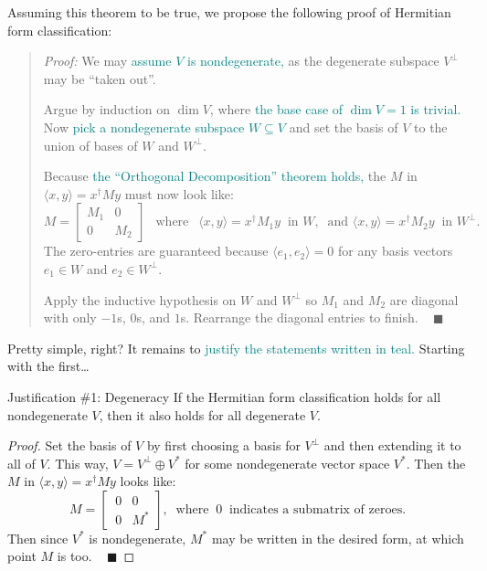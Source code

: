 Assuming this theorem to be true, we propose the following proof of Hermitian form classification: \vspace{0.1cm}
\begin{quote}
    \textit{Proof:} We may \textcolor{teal}{assume $V$ is nondegenerate,} as the degenerate subspace $V^{\perp}$ may be ``taken out''. \vspace{0.2cm}
    
    Argue by induction on $\dim V$, where \textcolor{teal}{the base case of $\dim V = 1$ is trivial.}  Now \textcolor{teal}{pick a nondegenerate subspace $W \subseteq V$} and set the basis of $V$ to the union of bases of $W$ and $W^{\perp}$. \vspace{0.2cm}
    
    Because \textcolor{teal}{the ``Orthogonal Decomposition'' theorem holds,} the $M$ in $\langle x, y \rangle = x^{\dagger}My$ must now look like:
    \[ M = \begin{bmatrix} M_1 & 0 \\ 0 & M_2 \end{bmatrix} ~~ \text{ where } ~ ~\langle x, y \rangle = x^{\dagger}M_1y ~ \text{ in } W, ~ \text{ and } \langle x, y \rangle = x^{\dagger}M_2y ~ \text{ in } W^{\perp}. \]
    The zero-entries are guaranteed because $\langle e_1, e_2 \rangle = 0$ for any basis vectors $e_1 \in W$ and $e_2 \in W^{\perp}$. \vspace{0.2cm}
    
    Apply the inductive hypothesis on $W$ and $W^{\perp}$ so $M_1$ and $M_2$ are diagonal with only $-1$s, $0$s, and $1$s.  Rearrange the diagonal entries to finish. ~ $\blacksquare$
\end{quote}

Pretty simple, right?  It remains to \textcolor{teal}{justify the statements written in teal.}  Starting with the first\dots

\begin{theorem}{Justification \#1: Degeneracy}
    If the Hermitian form classification holds for all nondegenerate $V$, then it also holds for all degenerate $V$.
\end{theorem}

\begin{proof}
    Set the basis of $V$ by first choosing a basis for $V^{\perp}$ and then extending it to all of $V$.  This way, $V = V^{\perp} \oplus V^*$ for some nondegenerate vector space $V^*$.  Then the $M$ in $\langle x, y \rangle = x^{\dagger}My$ looks like:
    \[ M = \begin{bmatrix} \ \boxed{0} & \boxed{0} \\ \ \boxed{0} & M^* \end{bmatrix}\!, ~ \text{ where } ~ \boxed{0} ~ \text{ indicates a submatrix of zeroes.} \]
    Then since $V^*$ is nondegenerate, $M^*$ may be written in the desired form, at which point $M$ is too. ~ $\blacksquare$
\end{proof}

